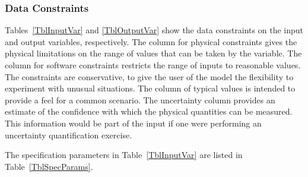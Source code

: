 \documentclass[12pt]{article}
\begin{document}
 

\subsubsection{Data Constraints} \label{sec_DataConstraints}    

Tables~\ref{TblInputVar} and \ref{TblOutputVar} show the data constraints on the
input and output variables, respectively.  The column for physical constraints gives
the physical limitations on the range of values that can be taken by the
variable.  The column for software constraints restricts the range of inputs to
reasonable values.  The constraints are conservative, to give the user of the
model the flexibility to experiment with unusual situations.  The column of
typical values is intended to provide a feel for a common scenario.  The
uncertainty column provides an estimate of the confidence with which the
physical quantities can be measured.  This information would be part of the
input if one were performing an uncertainty quantification exercise.

The specification parameters in Table~\ref{TblInputVar} are listed in
Table~\ref{TblSpecParams}.
\end{document}
